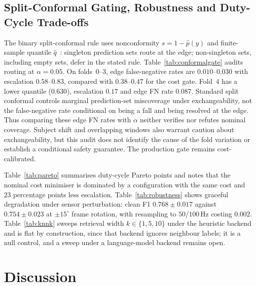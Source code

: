 \documentclass[journal]{IEEEtran}
\begin{document}






\subsection{Split-Conformal Gating, Robustness and Duty-Cycle Trade-offs}
\label{sec:conformal}
The binary split-conformal rule uses nonconformity $s=1-\hat{p}(y)$ and finite-sample quantile $\hat{q}$~\cite{vovk2005algorithmic,angelopoulos2023gentle}: singleton prediction sets route at the edge; non-singleton sets, including empty sets, defer in the stated rule. Table~\ref{tab:conformalgate} audits routing at $\alpha{=}0.05$. On folds~0--3, edge false-negative rates are $0.010$--$0.030$ with escalation $0.58$--$0.83$, compared with $0.38$--$0.47$ for the cost gate. Fold~4 has a lower quantile ($0.630$), escalation $0.17$ and edge FN rate $0.087$. Standard split conformal controls marginal prediction-set miscoverage under exchangeability, not the false-negative rate conditional on being a fall and being resolved at the edge. Thus comparing these edge FN rates with $\alpha$ neither verifies nor refutes nominal coverage. Subject shift and overlapping windows also warrant caution about exchangeability, but this audit does not identify the cause of the fold variation or establish a conditional safety guarantee. The production gate remains cost-calibrated.

Table~\ref{tab:pareto} summarises duty-cycle Pareto points and notes that the nominal cost minimiser is dominated by a configuration with the same cost and $23$ percentage points less escalation. Table~\ref{tab:robustness} shows graceful degradation under sensor perturbation: clean F1 $0.768{\pm}0.017$ against $0.754{\pm}0.023$ at $\pm15^\circ$ frame rotation, with resampling to $50$/$100$\,Hz costing $0.002$. Table~\ref{tab:knnk} sweeps retrieval width $k\in\{1,5,10\}$ under the heuristic backend and is flat by construction, since that backend ignores neighbour labels; it is a null control, and a sweep under a language-model backend remains open.






\section{Discussion}
\label{sec:discussion}
\end{document}
